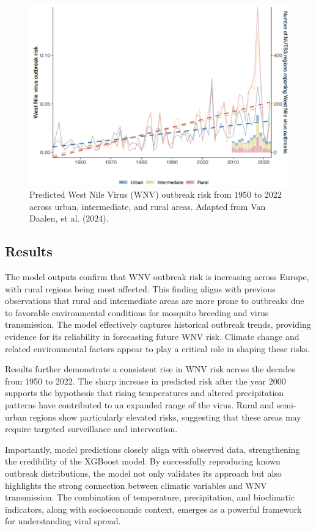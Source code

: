 \documentclass[
]{krantz}
\begin{document}
\begin{figure}
\includegraphics[width=1\linewidth]{3} \caption{Predicted West Nile Virus (WNV) outbreak risk from 1950 to 2022 across urban, intermediate, and rural areas. Adapted from Van Daalen, et al. (2024).}\label{fig:wnvrisktrend}
\end{figure}

\subsection{Results}\label{results-3}

The model outputs confirm that WNV outbreak risk is increasing across Europe, with rural regions being most affected. This finding aligns with previous observations that rural and intermediate areas are more prone to outbreaks due to favorable environmental conditions for mosquito breeding and virus transmission. The model effectively captures historical outbreak trends, providing evidence for its reliability in forecasting future WNV risk. Climate change and related environmental factors appear to play a critical role in shaping these risks.

Results further demonstrate a consistent rise in WNV risk across the decades from 1950 to 2022. The sharp increase in predicted risk after the year 2000 supports the hypothesis that rising temperatures and altered precipitation patterns have contributed to an expanded range of the virus. Rural and semi-urban regions show particularly elevated risks, suggesting that these areas may require targeted surveillance and intervention.

Importantly, model predictions closely align with observed data, strengthening the credibility of the XGBoost model. By successfully reproducing known outbreak distributions, the model not only validates its approach but also highlights the strong connection between climatic variables and WNV transmission. The combination of temperature, precipitation, and bioclimatic indicators, along with socioeconomic context, emerges as a powerful framework for understanding viral spread.
\end{document}
